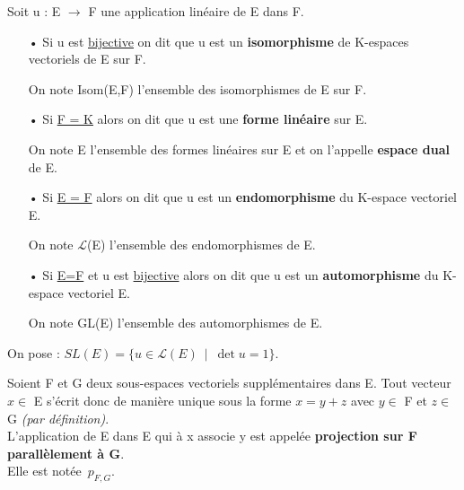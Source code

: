 \noindent Soit u : E \(\to\) F une application linéaire de E dans F.\vspace{-0.1cm}
\begin{itemize}
    \item[•] Si u est \underline{bijective} on dit que u est un \textbf{isomorphisme} de K-espaces vectoriels de E sur F.\\
    \begin{small}
        On note Isom(E,F) l'ensemble des isomorphismes de E sur F.
    \end{small}\vspace{0.2cm}

    \item[•] Si \underline{F = K} alors on dit que u est une \textbf{forme linéaire} sur E.\\
    \begin{small}
        On note E\expo{*} l'ensemble des formes linéaires sur E et on l'appelle \textbf{espace dual} de E.
    \end{small}\vspace{0.2cm}

    \item[•] Si \underline{E = F} alors on dit que u est un \textbf{endomorphisme} du K-espace vectoriel E.\\
    \begin{small}
        On note $\mathscr{L}$(E) l'ensemble des endomorphismes de E.
    \end{small}\vspace{0.2cm}

    \item[•] Si \underline{E=F} et u est \underline{bijective} alors on dit que u est un \textbf{automorphisme} du K-espace vectoriel E.\\
    \begin{small}
        On note GL(E) l'ensemble des automorphismes de E.
    \end{small}
\end{itemize}

\vspace{1cm}

\noindent On pose : \(SL(E)=\{u\in \mathscr{L}(E) \ \mid \ \det u=1 \}.\)

\vspace{1cm}

Soient F et G deux sous-espaces vectoriels supplémentaires dans E. Tout vecteur \(x\in\) E s'écrit donc de manière unique sous la forme \(x=y+z\) avec \(y\in\) F et \(z\in\) G \emph{(par définition)}. \\
L'application de E dans E qui à x associe y est appelée \textbf{projection sur F parallèlement à G}.\\
Elle est notée \(\,\displaystyle p_{F,G}\).

